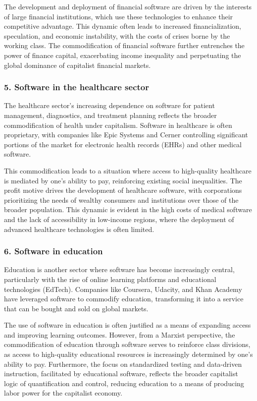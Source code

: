 \begin{refsection}
\begin{multicols}{2}
{The development and deployment of financial software are driven by the interests of large financial institutions, which use these technologies to enhance their competitive advantage. This dynamic often leads to increased financialization, speculation, and economic instability, with the costs of crises borne by the working class. The commodification of financial software further entrenches the power of finance capital, exacerbating income inequality and perpetuating the global dominance of capitalist financial markets.

\subsubsection*{5. Software in the healthcare sector}

The healthcare sector's increasing dependence on software for patient management, diagnostics, and treatment planning reflects the broader commodification of health under capitalism. Software in healthcare is often proprietary, with companies like Epic Systems and Cerner controlling significant portions of the market for electronic health records (EHRs) and other medical software.

This commodification leads to a situation where access to high-quality healthcare is mediated by one's ability to pay, reinforcing existing social inequalities. The profit motive drives the development of healthcare software, with corporations prioritizing the needs of wealthy consumers and institutions over those of the broader population. This dynamic is evident in the high costs of medical software and the lack of accessibility in low-income regions, where the deployment of advanced healthcare technologies is often limited.

\subsubsection*{6. Software in education}

Education is another sector where software has become increasingly central, particularly with the rise of online learning platforms and educational technologies (EdTech). Companies like Coursera, Udacity, and Khan Academy have leveraged software to commodify education, transforming it into a service that can be bought and sold on global markets.

The use of software in education is often justified as a means of expanding access and improving learning outcomes. However, from a Marxist perspective, the commodification of education through software serves to reinforce class divisions, as access to high-quality educational resources is increasingly determined by one's ability to pay. Furthermore, the focus on standardized testing and data-driven instruction, facilitated by educational software, reflects the broader capitalist logic of quantification and control, reducing education to a means of producing labor power for the capitalist economy.

}
\end{multicols}
\end{refsection}
